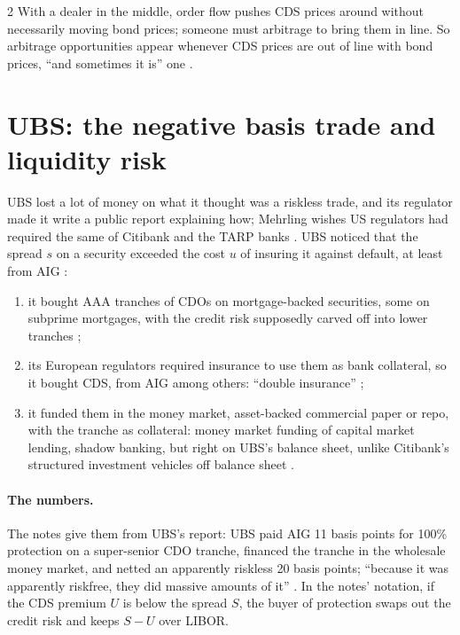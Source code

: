 \begin{paracol}{2}
With a dealer in the middle, order flow pushes CDS prices around without necessarily moving bond prices; someone must arbitrage to bring them in line. So
arbitrage opportunities appear whenever CDS prices are out of line with bond prices, ``and sometimes it is'' one .

\section{UBS: the negative basis trade and liquidity risk}\label{sec:cds-ubs}

UBS lost a lot of money on what it thought was a riskless trade, and its regulator made it write a public report explaining how; Mehrling wishes US regulators had
required the same of Citibank and the TARP banks . UBS noticed that the spread $s$ on a security exceeded the
cost $u$ of insuring it against default, at least from AIG :
\begin{enumerate}
  \item it bought AAA tranches of CDOs on mortgage-backed securities, some on subprime mortgages, with the credit risk supposedly carved off into lower tranches
        ;
  \item its European regulators required insurance to use them as bank collateral, so it bought CDS, from AIG among others: ``double insurance''
        ;
  \item it funded them in the money market, asset-backed commercial paper or repo, with the tranche as collateral: money market funding of capital market lending,
        shadow banking, but right on UBS's balance sheet, unlike Citibank's structured investment vehicles off balance sheet .
\end{enumerate}

\begin{nfigure}
\begin{taccts}
\end{taccts}
\caption{The negative basis trade .}\label{fig:cds-ubs}
\end{nfigure}

\paragraph{The numbers.} The notes give them from UBS's report: UBS paid AIG 11 basis points for 100\% protection on a super-senior CDO tranche, financed the tranche in the wholesale money
market, and netted an apparently riskless 20 basis points; ``because it was apparently riskfree, they did massive amounts of it'' . In the notes' notation, if the CDS premium $U$ is below
the spread $S$, the buyer of protection swaps out the credit risk and keeps $S-U$ over LIBOR.


\end{paracol}
